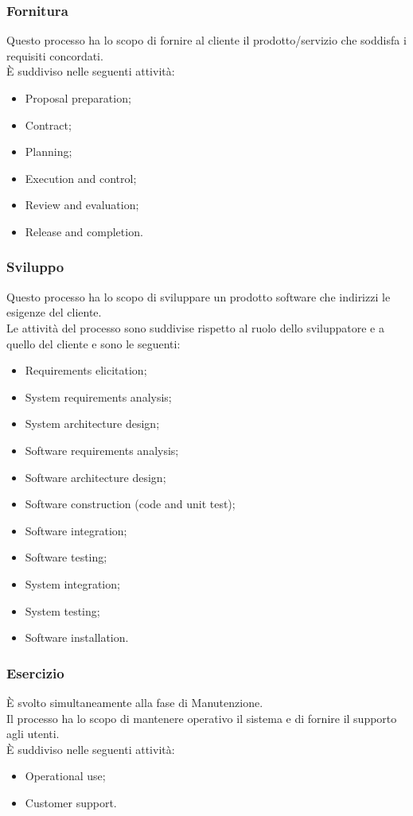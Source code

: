 \subsubsection{Fornitura}
Questo processo ha lo scopo di fornire al cliente il prodotto/servizio che soddisfa i requisiti concordati.\\
È suddiviso nelle seguenti attività:
\begin{itemize}
  \item Proposal preparation;
  \item Contract;
  \item Planning;
  \item Execution and control;
  \item Review and evaluation;
  \item Release and completion.
\end{itemize}

\subsubsection{Sviluppo}
Questo processo ha lo scopo di sviluppare un prodotto software che indirizzi le esigenze del cliente.\\
Le attività del processo sono suddivise rispetto al ruolo dello sviluppatore e a quello del cliente e sono le seguenti:
\begin{itemize}
  \item Requirements elicitation;
  \item System requirements analysis;
  \item System architecture design;
  \item Software requirements analysis;
  \item Software architecture design;
  \item Software construction (code and unit test);
  \item Software integration;
  \item Software testing;
  \item System integration;
  \item System testing;
  \item Software installation.
\end{itemize}

\subsubsection{Esercizio}
È svolto simultaneamente alla fase di Manutenzione.\\
Il processo ha lo scopo di mantenere operativo il sistema e di fornire il supporto agli utenti.\\
È suddiviso nelle seguenti attività:
\begin{itemize}
  \item Operational use;
  \item Customer support.
\end{itemize}

